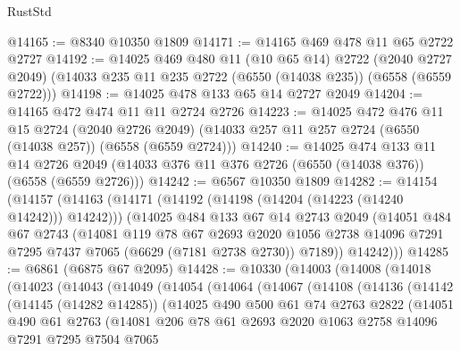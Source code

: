 \begin{lexlean}{RustStd}
\begin{coremodule}
@14165 := @8340 @10350 @1809
@14171 := @14165 @469 @478 @11 @65 @2722 @2727
@14192 := @14025
    @469
    @480
    @11
    (@10 @65 @14)
    @2722
    (@2040 @2727 @2049)
    (@14033 @235 @11 @235 @2722 (@6550 (@14038 @235)) (@6558 (@6559 @2722)))
@14198 := @14025 @478 @133 @65 @14 @2727 @2049
@14204 := @14165 @472 @474 @11 @11 @2724 @2726
@14223 := @14025
    @472
    @476
    @11
    @15
    @2724
    (@2040 @2726 @2049)
    (@14033 @257 @11 @257 @2724 (@6550 (@14038 @257)) (@6558 (@6559 @2724)))
@14240 := @14025
    @474
    @133
    @11
    @14
    @2726
    @2049
    (@14033 @376 @11 @376 @2726 (@6550 (@14038 @376)) (@6558 (@6559 @2726)))
@14242 := @6567 @10350 @1809
@14282 := @14154
    (@14157
      (@14163
        (@14171 (@14192 (@14198 (@14204 (@14223 (@14240 @14242))) @14242)))
        (@14025
          @484
          @133
          @67
          @14
          @2743
          @2049
          (@14051
            @484
            @67
            @2743
            (@14081
              @119
              @78
              @67
              @2693
              @2020
              @1056
              @2738
              @14096
              @7291
              @7295
              @7437
              @7065
              (@6629 (@7181 @2738 @2730))
              @7189))
          @14242)))
@14285 := @6861 (@6875 @67 @2095)
@14428 := @10330
    (@14003
      (@14008
        (@14018
          (@14023
            (@14043
              (@14049
                (@14054
                  (@14064
                    (@14067
                      (@14108
                        (@14136
                          (@14142
                            (@14145 (@14282 @14285))
                            (@14025
                              @490
                              @500
                              @61
                              @74
                              @2763
                              @2822
                              (@14051
                                @490
                                @61
                                @2763
                                (@14081
                                  @206
                                  @78
                                  @61
                                  @2693
                                  @2020
                                  @1063
                                  @2758
                                  @14096
                                  @7291
                                  @7295
                                  @7504
                                  @7065

\end{coremodule}
\end{lexlean}
